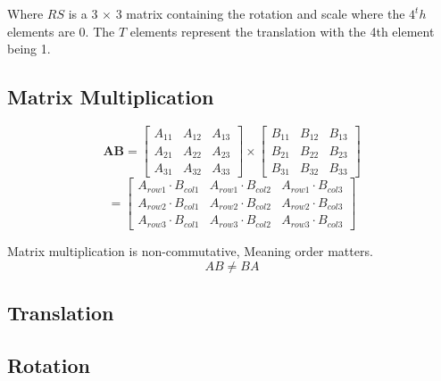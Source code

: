 \begin{flushleft}
Where $RS$ is a 3 $\times$ 3 matrix containing the rotation and scale where the $4^th$ elements are 0. The $T$ elements represent the translation with the 4th element being 1. 
\end{flushleft}

\subsection{Matrix Multiplication}

\begin{equation}
\textbf{AB} = \begin{bmatrix}
A_{11} & A_{12} & A_{13}\\
A_{21} & A_{22} & A_{23}\\
A_{31} & A_{32} & A_{33}
\end{bmatrix}
\times
\begin{bmatrix}
B_{11} & B_{12} & B_{13}\\
B_{21} & B_{22} & B_{23}\\
B_{31} & B_{32} & B_{33}
\end{bmatrix}
\end{equation}
\begin{equation}
= \begin{bmatrix}
A_{row1} \cdot B_{col1} & A_{row1} \cdot B_{col2} & A_{row1} \cdot B_{col3}\\
A_{row2} \cdot B_{col1} & A_{row2} \cdot B_{col2} & A_{row2} \cdot B_{col3}\\
A_{row3} \cdot B_{col1} & A_{row3} \cdot B_{col2} & A_{row3} \cdot B_{col3}
\end{bmatrix}
\end{equation}

\begin{flushleft}
Matrix multiplication is non-commutative, Meaning order matters.
\begin{equation}
AB \neq BA
\end{equation}
\end{flushleft}



\subsection{Translation}



\subsection{Rotation}

